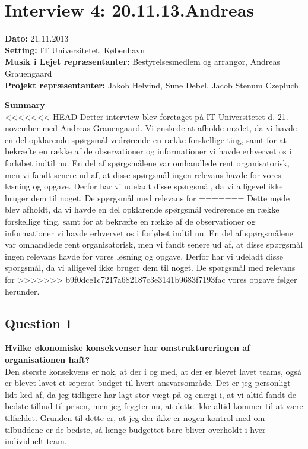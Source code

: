 \section{Interview 4: 20.11.13.Andreas}
\label{sec:interview_4}

\textbf{Dato:} 21.11.2013 \\
\textbf{Setting:} IT Universitetet, København \\
\textbf{Musik i Lejet repræsentanter:} Bestyrelsesmedlem og arrangør, Andreas Grauengaard  \\
\textbf{Projekt repræsentanter:} Jakob Helvind, Sune Debel, Jacob Stenum Czepluch

\bigskip

\noindent \textbf{Summary} \\
<<<<<<< HEAD
Detter interview blev foretaget på IT Universitetet d. 21. november med Andreas Grauengaard. Vi ønskede at afholde mødet, da vi havde en del opklarende spørgsmål vedrørende en række forskellige ting, samt for at bekræfte en række af de observationer og informationer vi havde erhvervet os i forløbet indtil nu. En del af spørgsmålene var omhandlede \mil rent organisatorisk, men vi fandt senere ud af, at disse spørgsmål ingen relevans havde for vores løsning og opgave. Derfor har vi udeladt disse spørgsmål, da vi alligevel ikke bruger dem til noget. De spørgsmål med relevans for
=======
Dette møde blev afholdt, da vi havde en del opklarende spørgsmål vedrørende en række forskellige
ting, samt for at bekræfte en række af de observationer og informationer vi havde erhvervet os i
forløbet indtil nu. En del af spørgsmålene var omhandlede \mil rent organisatorisk, men vi fandt
senere ud af, at disse spørgsmål ingen relevans havde for vores løsning og opgave. Derfor har vi
udeladt disse spørgsmål, da vi alligevel ikke bruger dem til noget. De spørgsmål med relevans for
>>>>>>> b9f0dce1c7217a682187c3e3141b9683f7193fac
vores opgave følger herunder.

\subsection{Question 1}
\label{i3q1}
\noindent \textbf{Hvilke økonomiske konsekvenser har omstruktureringen af organisationen haft?} 
\\
Den største konsekvens er nok, at der i og med, at der er blevet lavet teams, også er blevet lavet
et seperat budget til hvert ansvarsområde. Det er jeg personligt lidt ked af, da jeg tidligere har
lagt stor vægt på og energi i, at vi altid fandt de bedste tilbud til prisen, men jeg frygter nu, at
dette ikke altid kommer til at være tilfældet. Grunden til dette er, at jeg der ikke er nogen
kontrol med om tilbuddene er de bedste, så længe budgettet bare bliver overholdt i hver individuelt
team.

